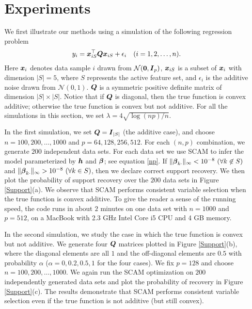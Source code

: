 \section{Experiments}
\label{sec:thesims}
We first illustrate our methods using a simulation of the following regression problem
\begin{equation}\nonumber
         y_i = \boldsymbol{x}_{iS}^{\top}\boldsymbol{Q}\boldsymbol{x}_{iS} + \epsilon_i \quad (i=1,2,\ldots,n).
\end{equation}
Here $\boldsymbol{x}_{i}$ denotes data sample $i$ drawn from $\mathcal{N}(\boldsymbol{0},\boldsymbol{I}_{p})$, 
$\boldsymbol{x}_{iS}$ is a subset of $\boldsymbol{x}_i$ with dimension $|S|=5$, where $S$ represents the active feature set, and 
$\epsilon_i$ is the additive noise drawn from $\mathcal{N}(0,1)$. 
$\boldsymbol{Q}$ is a symmetric positive definite matrix of dimension $|S|\times{}|S|$. 
Notice that if $\boldsymbol{Q}$ is diagonal, then the true function is convex additive; otherwise the true function is convex but not additive.
For all the simulations in this section, we set $\lambda=4\sqrt{{\log(np)}/{n}}$.

In the first simulation, we set $\boldsymbol{Q}=\boldsymbol{I}_{|S|}$ (the additive
case), and choose $n=100, 200,\ldots,1000$ and $p=64,128,256,512$.
For each $(n,p)$ combination, we generate $200$ independent data
sets. For each data set we use SCAM to infer the model parameterized
by $\boldsymbol{h}$ and $\boldsymbol{\beta}$; see equation \eqref{np}. If
$\|\bds{\beta}_{k\cdot}\|_{\infty}<10^{-8}\ (\forall k\not\in{}S)$ and
$\|\bds{\beta}_{k\cdot}\|_{\infty}>10^{-8}\ (\forall k\in{}S)$, then
we declare correct support recovery. We then plot the probability of
support recovery over the $200$ data sets in Figure \ref{Support}(a).  We
observe that SCAM performs consistent variable selection when the true
function is convex additive.  
To give the reader a
sense of the running speed, the code runs in about $2$ minutes on one
data set with $n=1000$ and $p=512$, on a MacBook with 2.3 GHz Intel
Core i5 CPU and 4 GB memory.

In the second simulation, we study the case in which the true function
is convex but not additive. We generate four $\boldsymbol{Q}$ matrices
plotted in Figure \ref{Support}(b), where the diagonal elements are all $1$ and
the off-diagonal elements are $0.5$ with probability $\alpha$
($\alpha=0,0.2,0.5,1$ for the four cases). We fix $p=128$ and choose
$n=100,200,\ldots,1000$. We again run the SCAM optimization on $200$
independently generated data sets and plot the probability of recovery
in Figure \ref{Support}(c). The results demonstrate that SCAM performs
consistent variable selection even if the true function is not additive (but
still convex).

